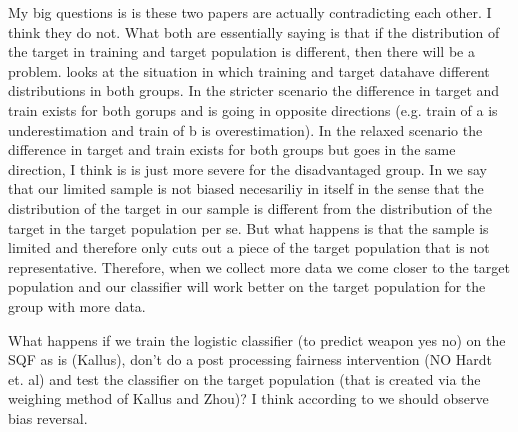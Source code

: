 My big questions is is these two papers are actually contradicting each other. I think they do not.
What both are essentially saying is that if the distribution of the target in training and target population is different,
then there will be a problem. \cite{kallus} looks at the situation in which training and target datahave different distributions
in both groups. In the stricter scenario the difference in target and train exists for both gorups and is going in opposite directions
(e.g. train of a is underestimation and train of b is overestimation). In the relaxed scenario the difference in target
and train exists for both groups but goes in the same direction, I think is is just more severe for the disadvantaged group.
In \cite{RambachanBBOEFW} we say that our limited sample is not biased necesariliy in itself in the sense that the distribution of the target
in our sample is different from the distribution of the target in the target population per se. But what happens is that the sample
is limited and therefore only cuts out a piece of the target population that is not representative. Therefore, when we collect more data
we come closer to the target population and our classifier will work better on the target population for the group with more data.

What happens if we train the logistic classifier (to predict weapon yes no) on the SQF as is (Kallus), don’t do a post processing fairness intervention (NO Hardt et. al)
and test the classifier on the target population (that is created via the weighing method of Kallus and Zhou)? I think according to \cite{RambachanBBOEFW} we should observe bias reversal.